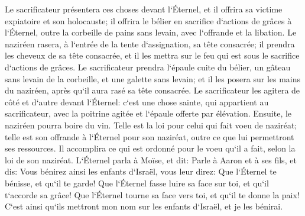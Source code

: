\verse Le sacrificateur présentera ces choses devant l`Éternel, et il offrira sa victime expiatoire et son holocauste; 
\verse il offrira le bélier en sacrifice d`actions de grâces à l`Éternel, outre la corbeille de pains sans levain, avec l`offrande et la libation. 
\verse Le naziréen rasera, à l`entrée de la tente d`assignation, sa tête consacrée; il prendra les cheveux de sa tête consacrée, et il les mettra sur le feu qui est sous le sacrifice d`actions de grâces. 
\verse Le sacrificateur prendra l`épaule cuite du bélier, un gâteau sans levain de la corbeille, et une galette sans levain; et il les posera sur les mains du naziréen, après qu`il aura rasé sa tête consacrée. 
\verse Le sacrificateur les agitera de côté et d`autre devant l`Éternel: c`est une chose sainte, qui appartient au sacrificateur, avec la poitrine agitée et l`épaule offerte par élévation. Ensuite, le naziréen pourra boire du vin. 
\verse Telle est la loi pour celui qui fait voeu de naziréat; telle est son offrande à l`Éternel pour son naziréat, outre ce que lui permettront ses ressources. Il accomplira ce qui est ordonné pour le voeu qu`il a fait, selon la loi de son naziréat. 
\verse L`Éternel parla à Moïse, et dit: 
\verse Parle à Aaron et à ses fils, et dis: Vous bénirez ainsi les enfants d`Israël, vous leur direz: 
\verse Que l`Éternel te bénisse, et qu`il te garde! 
\verse Que l`Éternel fasse luire sa face sur toi, et qu`il t`accorde sa grâce! 
\verse Que l`Éternel tourne sa face vers toi, et qu`il te donne la paix! 
\verse C`est ainsi qu`ils mettront mon nom sur les enfants d`Israël, et je les bénirai. 

